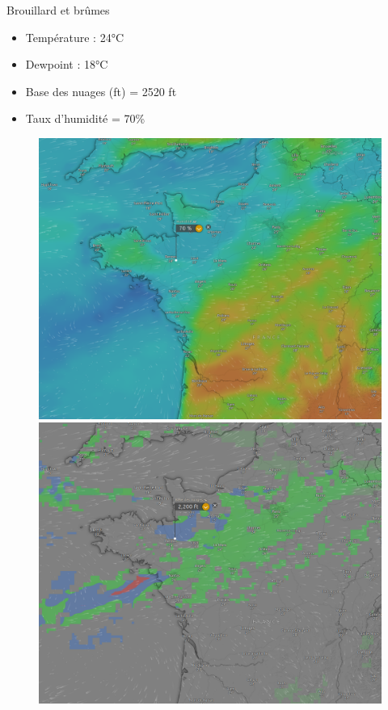 \documentclass{beamer}
\begin{document}
\begin{frame}{Brouillard et brûmes}
  \begin{itemize}
    \item Température : 24°C \pause
    \item Dewpoint : 18°C \pause
    \item Base des nuages (ft) = 2520 ft \pause
    \item Taux d'humidité = 70\% \pause
  \end{itemize}

  \begin{figure}
    \centering
    \includegraphics[scale=0.5]{images/windy-humidity.png}
    \includegraphics[scale=0.5]{images/windy-cloudbase.png}
  \end{figure}
\end{frame}
\end{document}
